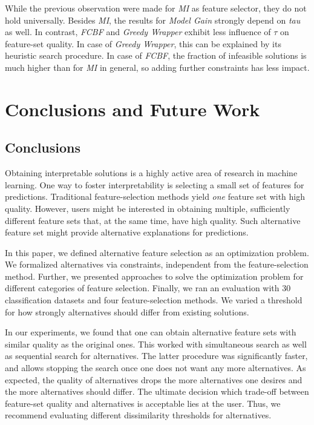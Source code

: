 \documentclass[conference]{IEEEtran}
\theoremstyle{definition}
\begin{document}
While the previous observation were made for \emph{MI} as feature selector, they do not hold universally.
Besides \emph{MI}, the results for \emph{Model Gain} strongly depend on \emph{tau} as well.
In contrast, \emph{FCBF} and \emph{Greedy Wrapper} exhibit less influence of $\tau$ on feature-set quality.
In case of \emph{Greedy Wrapper}, this can be explained by its heuristic search procedure.
In case of \emph{FCBF}, the fraction of infeasible solutions is much higher than for \emph{MI} in general, so adding further constraints has less impact.

\section{Conclusions and Future Work}
\label{sec:conclusion}

\balance %

\subsection{Conclusions}

Obtaining interpretable solutions is a highly active area of research in machine learning.
One way to foster interpretability is selecting a small set of features for predictions.
Traditional feature-selection methods yield \emph{one} feature set with high quality.
However, users might be interested in obtaining multiple, sufficiently different feature sets that, at the same time, have high quality.
Such alternative feature set might provide alternative explanations for predictions.

In this paper, we defined alternative feature selection as an optimization problem.
We formalized alternatives via constraints, independent from the feature-selection method.
Further, we presented approaches to solve the optimization problem for different categories of feature selection.
Finally, we ran an evaluation with 30 classification datasets and four feature-selection methods.
We varied a threshold for how strongly alternatives should differ from existing solutions.

In our experiments, we found that one can obtain alternative feature sets with similar quality as the original ones.
This worked with simultaneous search as well as sequential search for alternatives.
The latter procedure was significantly faster, and allows stopping the search once one does not want any more alternatives.
As expected, the quality of alternatives drops the more alternatives one desires and the more alternatives should differ.
The ultimate decision which trade-off between feature-set quality and alternatives is acceptable lies at the user.
Thus, we recommend evaluating different dissimilarity thresholds for alternatives.
\end{document}
